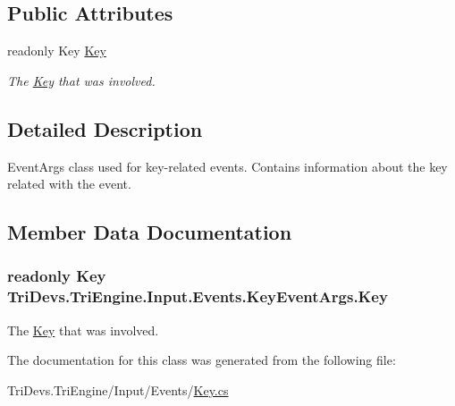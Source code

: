 \subsection*{Public Attributes}
\begin{DoxyCompactItemize}
\item 
readonly Key \hyperlink{class_tri_devs_1_1_tri_engine_1_1_input_1_1_events_1_1_key_event_args_a2d33f37030d8a349ff135765077f8cd8}{Key}
\begin{DoxyCompactList}\small\item\em The \hyperlink{class_tri_devs_1_1_tri_engine_1_1_input_1_1_events_1_1_key_event_args_a2d33f37030d8a349ff135765077f8cd8}{Key} that was involved. \end{DoxyCompactList}\end{DoxyCompactItemize}


\subsection{Detailed Description}
Event\-Args class used for key-\/related events. Contains information about the key related with the event. 



\subsection{Member Data Documentation}
\hypertarget{class_tri_devs_1_1_tri_engine_1_1_input_1_1_events_1_1_key_event_args_a2d33f37030d8a349ff135765077f8cd8}{
\subsubsection[{Key}]{\setlength{\rightskip}{0pt plus 5cm}readonly Key Tri\-Devs.\-Tri\-Engine.\-Input.\-Events.\-Key\-Event\-Args.\-Key}}\label{class_tri_devs_1_1_tri_engine_1_1_input_1_1_events_1_1_key_event_args_a2d33f37030d8a349ff135765077f8cd8}


The \hyperlink{class_tri_devs_1_1_tri_engine_1_1_input_1_1_events_1_1_key_event_args_a2d33f37030d8a349ff135765077f8cd8}{Key} that was involved. 



The documentation for this class was generated from the following file\-:\begin{DoxyCompactItemize}
\item 
Tri\-Devs.\-Tri\-Engine/\-Input/\-Events/\hyperlink{_key_8cs}{Key.\-cs}\end{DoxyCompactItemize}
